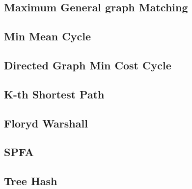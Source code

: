 \documentclass[a4paper,10pt,twocolumn,oneside]{article}
\begin{document}
\subsection{Maximum General graph Matching}


%

%

%

\subsection{Min Mean Cycle}


\subsection{Directed Graph Min Cost Cycle}


\subsection{K-th Shortest Path}


\subsection{Floryd Warshall}


\subsection{SPFA}


\subsection{Tree Hash}

\end{document}
